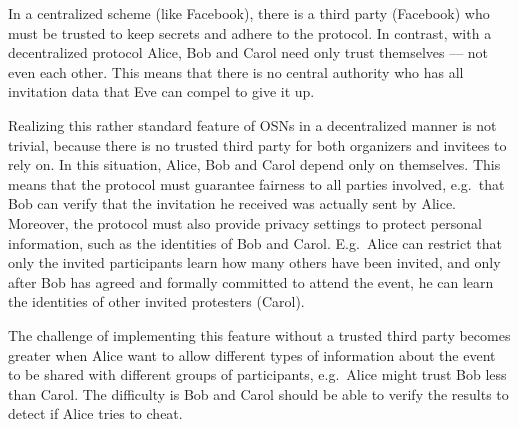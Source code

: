 
In a centralized scheme (like Facebook), there is a third party (Facebook) who 
must be trusted to keep secrets and adhere to the protocol.
In contrast, with a decentralized protocol
Alice, Bob and Carol need only trust themselves --- not even each other.
This means that there is no central authority who has all invitation data that 
Eve can compel to give it up.

Realizing this rather standard feature of \acp{OSN} in a decentralized manner is not 
trivial, because there is no trusted third party for both organizers and 
invitees to rely on.
In this situation, Alice, Bob and Carol depend only on themselves.
This means that the protocol must guarantee fairness to all parties involved, 
e.g.\ that Bob can verify that the invitation he received was actually sent by 
Alice.
Moreover, the protocol must also provide privacy settings to protect personal 
information, such as the identities of Bob and Carol.
E.g.\ Alice can restrict that only the invited participants learn how many 
others have been invited, and only after Bob has agreed and formally committed 
to attend the event, he can learn the identities of other invited protesters 
(Carol).

The challenge of implementing this feature without a trusted third party 
becomes greater when Alice want to allow different types of information about 
the event to be shared with different groups of participants, e.g.\ Alice might 
trust Bob less than Carol.
The difficulty is Bob and Carol should be able to verify the results to detect 
if Alice tries to cheat.

